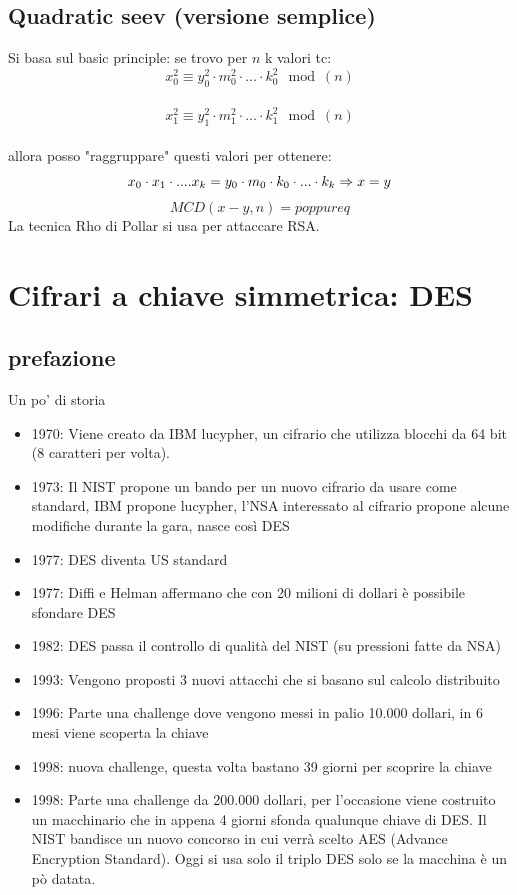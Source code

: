 \documentclass[10pt,a4paper]{article}
\begin{document}
\subsection{Quadratic seev (versione semplice)}
Si basa sul basic principle: se trovo per $n$ k valori tc:\\
$$x_0^2\equiv y_0^2\cdot m_0^2 \cdot ... \cdot k_0^2 \mod(n)$$ \\
$$x_1^2\equiv y_1^2\cdot m_1^2 \cdot ... \cdot k_1^2 \mod(n)$$ \\
allora posso "raggruppare" questi valori per ottenere:
$$
x_0\cdot x_1 \cdot .... x_k = y_0 \cdot m_0 \cdot k_0 \cdot ... \cdot k_k\\
\Rightarrow \\
x = y\\
$$
$$MCD(x-y,n)=p oppure q
$$
La tecnica Rho di Pollar si usa per attaccare RSA.
\section{Cifrari a chiave simmetrica: DES}
\subsection{prefazione}
Un po' di storia
\begin{itemize}
\item 1970: Viene creato da IBM lucypher, un cifrario che utilizza blocchi da 64 bit (8 caratteri per volta).
\item 1973: Il NIST propone un bando per un nuovo cifrario da usare come standard, IBM propone lucypher, l'NSA interessato al cifrario propone alcune modifiche durante la gara, nasce così DES
\item 1977: DES diventa US standard
\item 1977: Diffi e Helman affermano che con 20 milioni di dollari è possibile sfondare DES
\item 1982: DES passa il controllo di qualità del NIST (su pressioni fatte da NSA)
\item 1993: Vengono proposti 3 nuovi attacchi che si basano sul calcolo distribuito
\item 1996: Parte una challenge dove vengono messi in palio 10.000 dollari, in 6 mesi viene scoperta la chiave
\item 1998: nuova challenge, questa volta bastano 39 giorni per scoprire la chiave
\item 1998: Parte una challenge da 200.000 dollari, per l'occasione viene costruito un macchinario che in appena 4 giorni sfonda qualunque chiave di DES. Il NIST bandisce un nuovo concorso in cui verrà scelto AES (Advance Encryption Standard). Oggi si usa solo il triplo DES solo se la macchina è un pò datata.

\end{itemize}
\end{document}

